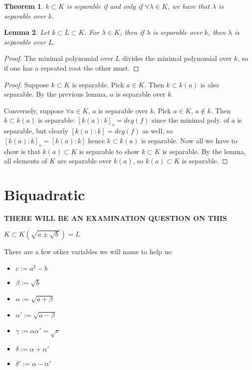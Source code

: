 \documentclass{article}
\theoremstyle{definition}
\theoremstyle{plain}%
\newtheorem{thm}{Theorem}[section]
\newtheorem{lem}[thm]{Lemma}
\theoremstyle{remark}
\begin{document}
\begin{thm}
    $k \subset K$ is separable if and only if $\forall \lambda \in K$, we have that $\lambda$ is separable over $k$.
\end{thm}

\begin{lem}
    Let $k \subset L \subset K$. For $\lambda \in K$, then if $\lambda$ is separable over $k$, then $\lambda$ is separable over $L$.
\end{lem}

\begin{proof}
    The minimal polynomial over $L$ divides the minimal polynomial over $k$, so if one has a repeated root the other must.
\end{proof}

\begin{proof}
    Suppose $k \subset K$ is separable. Pick $a \in K$. Then $k \subset k(a)$ is also separable. By the previous lemma, $a$ is separable over $k$.
    
    Conversely, suppose $\forall a \in K$, $a$ is separable over $k$. Pick $a \in K$, $a \not \in k$. Then $k \subset k(a)$ is separable: $[k(a) : k]_s = deg(f)$ since the minimal poly. of $a$ is separable, but clearly $[k(a) : k] = deg(f)$ as well, so $[k(a) : k]_s = [k(a) : k]$ hence $k \subset k(a)$ is separable. Now all we have to show is that $k(a) \subset K$ is separable to show $k \subset K$ is separable. By the lemma, all elements of $K$ are separable over $k(a)$, so $k(a) \subset K$ is separable.
\end{proof}


\section{Biquadratic}

\textbf{THERE WILL BE AN EXAMINATION QUESTION ON THIS}

$K \subset K(\sqrt{a \pm \sqrt{b}}) = L$

There are a few other variables we will name to help us:
\begin{itemize}
    \item $c := a^2 - b$
    \item $\beta := \sqrt{b}$
    \item $\alpha := \sqrt{a + \beta}$
    \item $\alpha' := \sqrt{a - \beta}$
    \item $\gamma := \alpha \alpha' = \sqrt{c}$
    \item $\delta := \alpha + \alpha'$
    \item $\delta' := \alpha - \alpha'$
\end{itemize}
\end{document}
